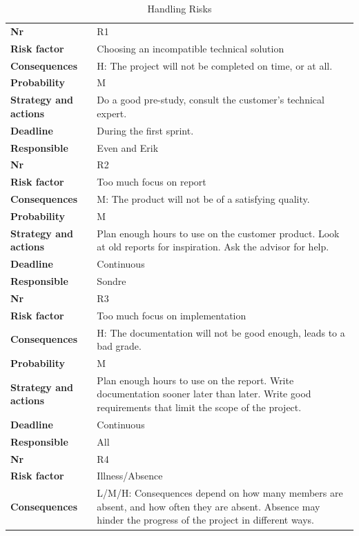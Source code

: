 \begin{longtable}{l p{9cm}}
\caption{Handling Risks} \\
\endhead
\hline
\textbf{Nr} & R1 \\
\textbf{Risk factor} & Choosing an incompatible technical solution \\
\textbf{Consequences} & H: The project will not be completed on time, or at all. \\
\textbf{Probability} & M \\ 
\textbf{Strategy and actions} & Do a good pre-study, consult the customer’s technical expert. \\
\textbf{Deadline} & During the first sprint.\\
\textbf{Responsible} & Even and Erik \\
\hline
\textbf{Nr} & R2 \\
\textbf{Risk factor} & Too much focus on report \\
\textbf{Consequences} & M: The product will not be of a satisfying quality. \\
\textbf{Probability} & M \\ 
\textbf{Strategy and actions} & Plan enough hours to use on the customer product. Look at old reports for inspiration. Ask the advisor for help. \\
\textbf{Deadline} & Continuous\\
\textbf{Responsible} & Sondre \\
\hline
\textbf{Nr} & R3 \\
\textbf{Risk factor} & Too much focus on implementation \\
\textbf{Consequences} & H: The documentation will not be good enough, leads to a bad grade. \\
\textbf{Probability} & M \\ 
\textbf{Strategy and actions} & Plan enough hours to use on the report. Write documentation sooner later than later. Write good requirements that limit the scope of the project. \\
\textbf{Deadline} & Continuous \\
\textbf{Responsible} & All \\
\hline
\textbf{Nr} & R4 \\
\textbf{Risk factor} & Illness/Absence \\
\textbf{Consequences} & L/M/H: Consequences depend on how many members are absent, and how often they are absent. Absence may hinder the progress of the project in different ways.  \\

\end{longtable}

